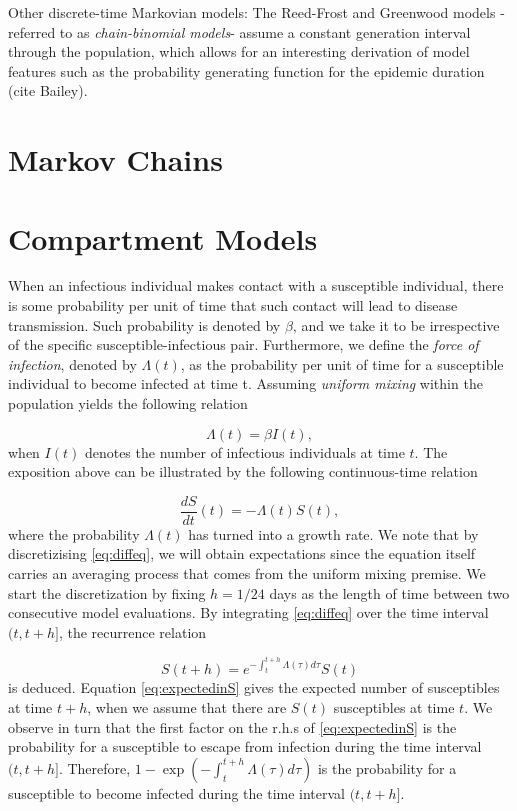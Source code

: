 \documentclass[a4paper,preprint]{elsarticle}
\begin{document}
Other discrete-time Markovian models: The Reed-Frost and Greenwood models -referred to as \textit{chain-binomial models}- assume a constant generation interval through the population, which allows for an interesting derivation of model features such as the probability generating function for the epidemic duration (cite Bailey).  


\section{Markov Chains}

\section{Compartment Models}

When an infectious individual makes contact with a susceptible individual, there is some probability per unit of time that such contact will lead to disease transmission. Such probability is denoted by $\beta$, and we take it to be irrespective of the specific susceptible-infectious pair. Furthermore, we define the \textit{force of infection}, denoted by $\Lambda(t)$, as the probability per unit of time for a susceptible individual to become infected at time t. Assuming \textit{uniform mixing} within the population yields the following relation 

\begin{equation}
\label{eq:lawofmassaction}
\Lambda(t)=\beta I(t),
\end{equation}
when $I(t)$ denotes the number of infectious individuals at time $t$. The exposition above can be illustrated by the following continuous-time relation   

\begin{equation}
\label{eq:diffeq}
    \dfrac{dS}{dt}(t)=-\Lambda(t)S(t),
\end{equation}
%
where the probability $\Lambda(t)$ has turned into a growth rate. We note that by discretizising \eqref{eq:diffeq}, we will obtain expectations since the equation itself carries an averaging process that comes from the uniform mixing premise. We start the discretization by fixing $h=1/24$ days as the length of time between two consecutive model evaluations. By integrating \eqref{eq:diffeq} over the time interval $(t,t+h]$, the recurrence relation 

\begin{equation} 
\label{eq:expectedinS}
        S(t+h)=e^{-\int_{t}^{t+h} \Lambda(\tau)d\tau}S(t) 
\end{equation}
%
is deduced. Equation \eqref{eq:expectedinS} gives the expected number of
susceptibles  at time $t+h$, when we assume that there are $S(t)$ susceptibles
at time $t$. We observe in turn that the first factor on the r.h.s of
\eqref{eq:expectedinS} is the probability for a susceptible to escape from
infection during the time interval $(t,t+h]$. Therefore,
$1-\exp(-\int_{t}^{t+h} \Lambda(\tau)d\tau)$ is the probability for a
susceptible to become infected during the time interval $(t,t+h]$. 
\end{document}
